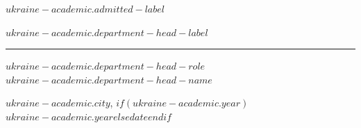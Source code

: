 \begin{titlepage}
\vspace{8.0em}

\begin{flushleft}
{\fontsize{14pt}{16.8pt}\selectfont $ukraine-academic.admitted-label$\par}

\vspace{1.1em}

\noindent\begin{minipage}[t]{0.30\textwidth}
\fontsize{14pt}{16.8pt}\selectfont $ukraine-academic.department-head-label$
\end{minipage}%
\begin{minipage}[t]{0.70\textwidth}
\raggedright
{\fontsize{14pt}{16.8pt}\selectfont \rule{3.6cm}{0.4pt}\hspace{1.0em} $ukraine-academic.department-head-role$ $ukraine-academic.department-head-name$\par}
\vspace{0.4em}
\end{minipage}
\end{flushleft}

\vfill

{\fontsize{14pt}{16.8pt}\selectfont $ukraine-academic.city$, $if(ukraine-academic.year)$$ukraine-academic.year$$else$$date$$endif$\par}
\end{titlepage}
